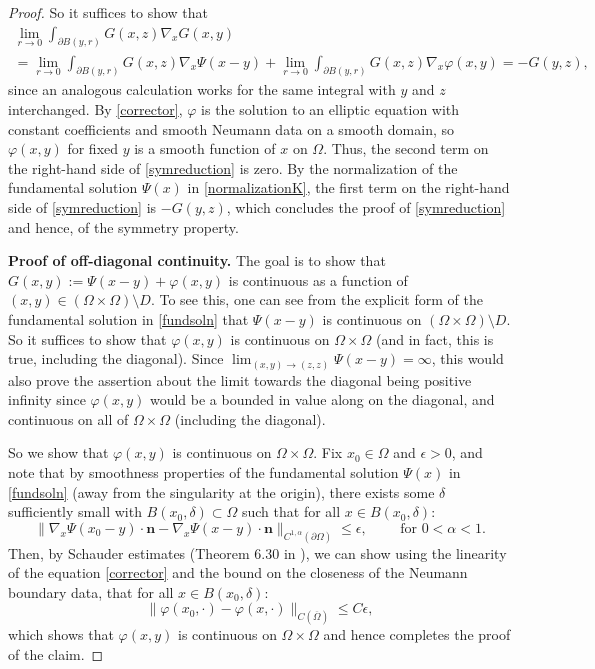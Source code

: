 \documentclass[12pt]{article}
\newcommand{\bd}{\boldsymbol}
\theoremstyle{plain}
\begin{document}
\begin{proof}
So it suffices to show that
\begin{multline}\label{symreduction}
\lim_{r \to 0} \int_{\partial B(y, r)} G(x, z) \nabla_{x}G(x, y) \\
= \lim_{r \to 0} \int_{\partial B(y, r)} G(x, z) \nabla_{x}\Psi(x - y) + \lim_{r \to 0} \int_{\partial B(y, r)} G(x, z) \nabla_{x}\varphi(x, y) = -G(y, z),
\end{multline}
since an analogous calculation works for the same integral with $y$ and $z$ interchanged. By \eqref{corrector}, $\varphi$ is the solution to an elliptic equation with constant coefficients and smooth Neumann data on a smooth domain, so $\varphi(x, y)$ for fixed $y$ is a smooth function of $x$ on $\Omega$. Thus, the second term on the right-hand side of \eqref{symreduction} is zero. By the normalization of the fundamental solution $\Psi(x)$ in \eqref{normalizationK}, the first term on the right-hand side of \eqref{symreduction} is $-G(y, z)$, which concludes the proof of \eqref{symreduction} and hence, of the symmetry property.

\medskip

\noindent \textbf{Proof of off-diagonal continuity.} The goal is to show that $G(x, y) := \Psi(x - y) + \varphi(x, y)$ is continuous as a function of $(x, y) \in (\Omega \times \Omega) \setminus D$. To see this, one can see from the explicit form of the fundamental solution in \eqref{fundsoln} that $\Psi(x - y)$ is continuous on $(\Omega \times \Omega) \setminus D$. So it suffices to show that $\varphi(x, y)$ is continuous on $\Omega \times \Omega$ (and in fact, this is true, including the diagonal). Since $\lim_{(x, y) \to (z, z)} \Psi(x - y) = \infty$, this would also prove the assertion about the limit towards the diagonal being positive infinity since $\varphi(x, y)$ would be a bounded in value along on the diagonal, and continuous on all of $\Omega \times \Omega$ (including the diagonal).

So we show that $\varphi(x, y)$ is continuous on $\Omega \times \Omega$. Fix $x_0 \in \Omega$ and $\epsilon > 0$, and note that by smoothness properties of the fundamental solution $\Psi(x)$ in \eqref{fundsoln} (away from the singularity at the origin), there exists some $\delta$ sufficiently small with $B(x_0, \delta) \subset \Omega$ such that for all $x \in B(x_0, \delta)$:
\begin{equation*}
\|\nabla_{x} \Psi(x_0 - y) \cdot \bd{n} - \nabla_x \Psi(x - y) \cdot \bd{n}\|_{C^{1, \alpha}(\partial \Omega)} \le \epsilon, \qquad \text{ for } 0 < \alpha < 1.
\end{equation*}
Then, by Schauder estimates (Theorem 6.30 in \cite{Gilbarg}), we can show using the linearity of the equation \eqref{corrector} and the bound on the closeness of the Neumann boundary data, that for all $x \in B(x_0, \delta)$:
\begin{equation*}
\|\varphi(x_0, \cdot) - \varphi(x, \cdot)\|_{C(\overline{\Omega})} \le C\epsilon,
\end{equation*}
which shows that $\varphi(x, y)$ is continuous on $\Omega \times \Omega$ and hence completes the proof of the claim.


\end{proof}
\end{document}
